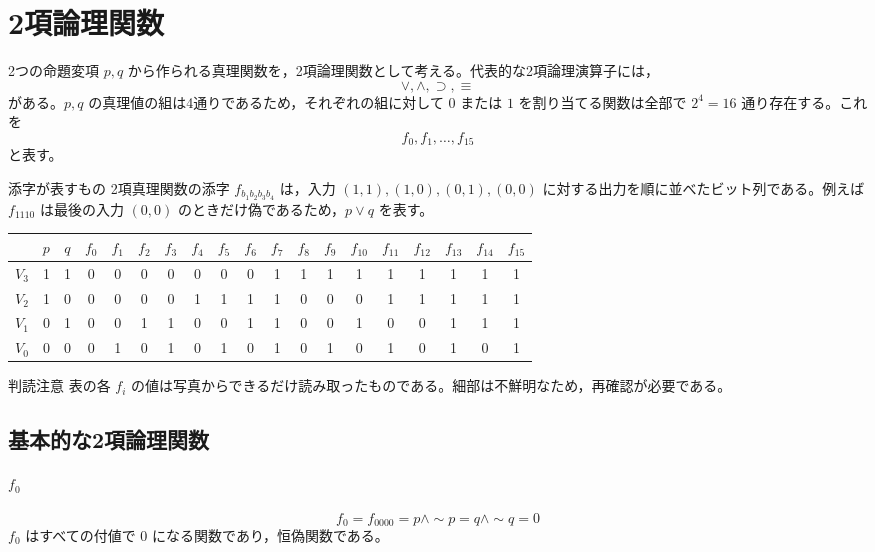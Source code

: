 \documentclass[../main.tex]{subfiles}
\begin{document}
\section{2項論理関数}

2つの命題変項 \(p,q\) から作られる真理関数を，2項論理関数として考える。代表的な2項論理演算子には，
\[
  \lor,\land,\supset,\equiv
\]
がある。\(p,q\) の真理値の組は4通りであるため，それぞれの組に対して \(0\) または \(1\) を割り当てる関数は全部で \(2^4=16\) 通り存在する。これを
\[
  f_0,f_1,\ldots,f_{15}
\]
と表す。

\begin{sidebox}[TBred]{添字が表すもの}
  2項真理関数の添字 \(f_{b_1b_2b_3b_4}\) は，入力 \((1,1),(1,0),(0,1),(0,0)\) に対する出力を順に並べたビット列である。例えば \(f_{1110}\) は最後の入力 \((0,0)\) のときだけ偽であるため，\(p\lor q\) を表す。
\end{sidebox}

\begin{center}
\scriptsize
\setlength{\tabcolsep}{3pt}
\begin{tabular}{c|cc|cccccccccccccccc}
\toprule
 & \(p\) & \(q\)
 & \(f_0\) & \(f_1\) & \(f_2\) & \(f_3\) & \(f_4\) & \(f_5\) & \(f_6\) & \(f_7\)
 & \(f_8\) & \(f_9\) & \(f_{10}\) & \(f_{11}\) & \(f_{12}\) & \(f_{13}\) & \(f_{14}\) & \(f_{15}\)
\\
\midrule
\(V_3\) & 1 & 1 & 0&0&0&0&0&0&0&1&1&1&1&1&1&1&1&1 \\
\(V_2\) & 1 & 0 & 0&0&0&0&1&1&1&1&0&0&0&1&1&1&1&1 \\
\(V_1\) & 0 & 1 & 0&0&1&1&0&0&1&1&0&0&1&0&0&1&1&1 \\
\(V_0\) & 0 & 0 & 0&1&0&1&0&1&0&1&0&1&0&1&0&1&0&1 \\
\bottomrule
\end{tabular}
\end{center}

\begin{sidebox}[TBred]{判読注意}
  表の各 \(f_i\) の値は写真からできるだけ読み取ったものである。細部は不鮮明なため，再確認が必要である。
\end{sidebox}

\subsection{基本的な2項論理関数}

\paragraph{\texorpdfstring{\(f_0\)}{f0}}
\[
  f_0
  =
  f_{0000}
  =
  p \land \sim p
  =
  q \land \sim q
  =
  0
\]
\(f_0\) はすべての付値で \(0\) になる関数であり，恒偽関数である。
\end{document}
